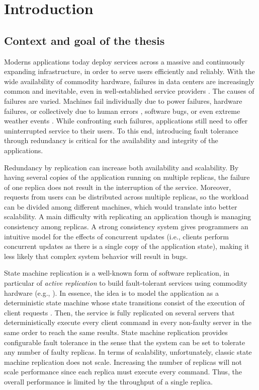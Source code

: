 \chapter[Introduction]{Introduction}

\section{Context and goal of the thesis}

Moderns applications today deploy services across a massive and
continuously expanding infrastructure, in order to serve users efficiently
and reliably. With the wide availability of commodity hardware, failures in data
centers are increasingly common and inevitable, even in well-established service
providers \citep{disruption:google}. The causes of failures are varied. Machines
fail individually due to power failures, hardware failures, or collectively due
to human errors \citep{disruption:amazon}, software bugs, or even extreme weather
events \citep{disruption:weather}. While confronting such failures, applications
still need to offer uninterrupted service to their users. To this end,
introducing fault tolerance through redundancy is critical for the availability
and integrity of the applications.

Redundancy by replication can increase both availability and scalability. By
having several copies of the application running on multiple replicas, the
failure of one replica does not result in the interruption of the service.
Moreover, requests from users can be distributed across multiple replicas, so
the workload can be divided among different machines, which would translate into
better scalability. A main difficulty with replicating an application though is
managing consistency among replicas. A strong consistency system gives
programmers an intuitive model for the effects of concurrent updates (i.e.,
clients perform concurrent updates as there is a single copy of the application
state), making it less likely that complex system behavior will result in bugs.

State machine replication is a well-known form of software replication, in
particular of \emph{active replication} to build fault-tolerant services using
commodity hardware (e.g.,
\cite{Shvachko:2003,Ghemawat:2003,Burrows:2006,MacCormick:2004}). In essence,
the idea is to model the application as a deterministic state machine whose
state transitions consist of the execution of client requests \cite{Lam78,
Sch90}. Then, the service is fully replicated on several servers that
deterministically execute every client command in every non-faulty server in the
same order to reach the same results. State machine replication provides
configurable fault tolerance in the sense that the system can be set to tolerate
any number of faulty replicas. In terms of scalability, unfortunately, classic
state machine replication does not scale. Increasing the number of replicas will
not scale performance since each replica must execute every command. Thus, the
overall performance is limited by the throughput of a single replica.

